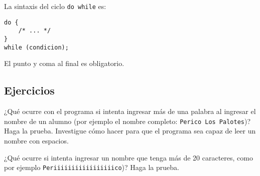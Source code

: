 La sintaxis del ciclo \lstinline!do while! es:

\begin{lstlisting}
do {
    /* ... */
}
while (condicion);
\end{lstlisting}

El punto y coma al final es obligatorio.

\subsection{Ejercicios}

¿Qué ocurre con el programa si intenta ingresar más de una palabra al
ingresar el nombre de un alumno (por ejemplo el nombre completo:
\lstinline!Perico Los Palotes!)? Haga la prueba. Investigue cómo hacer
para que el programa sea capaz de leer un nombre con espacios.

¿Qué ocurre si intenta ingresar un nombre que tenga más de 20
caracteres, como por ejemplo \lstinline!Periiiiiiiiiiiiiiiiico!)? Haga
la prueba.

